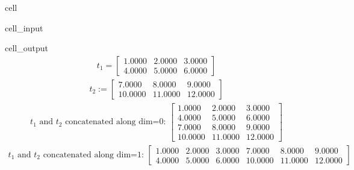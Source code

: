 \documentclass[letterpaper,10pt,english]{jupyterBook}
\begin{document}
\begin{sphinxuseclass}{cell}
\begin{sphinxVerbatimInput}
\begin{sphinxuseclass}{cell_input}
\end{sphinxuseclass}\end{sphinxVerbatimInput}
\begin{sphinxVerbatimOutput}

\begin{sphinxuseclass}{cell_output}\begin{equation*}
\begin{split}\displaystyle t_1=\left[
\begin{array}{}
  1.0000 &  2.0000 &  3.0000\\
  4.0000 &  5.0000 &  6.0000
\end{array}
\right]\end{split}
\end{equation*}\begin{equation*}
\begin{split}\displaystyle t_2:=\left[
\begin{array}{}
  7.0000 &  8.0000 &  9.0000\\
  10.0000 &  11.0000 &  12.0000
\end{array}
\right]\end{split}
\end{equation*}\begin{equation*}
\begin{split}\displaystyle t_1\text{ and }t_2\text{  concatenated along dim=0: }\left[
\begin{array}{}
  1.0000 &  2.0000 &  3.0000\\
  4.0000 &  5.0000 &  6.0000\\
  7.0000 &  8.0000 &  9.0000\\
  10.0000 &  11.0000 &  12.0000
\end{array}
\right]\end{split}
\end{equation*}\begin{equation*}
\begin{split}\displaystyle t_1\text{  and }t_2\text{  concatenated along dim=1: }\left[
\begin{array}{}
  1.0000 &  2.0000 &  3.0000 &  7.0000 &  8.0000 &  9.0000\\
  4.0000 &  5.0000 &  6.0000 &  10.0000 &  11.0000 &  12.0000
\end{array}
\right]\end{split}
\end{equation*}
\end{sphinxuseclass}\end{sphinxVerbatimOutput}

\end{sphinxuseclass}
\end{document}
